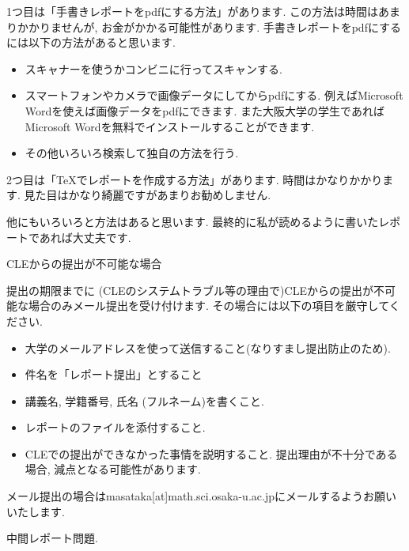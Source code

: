 \documentclass[dvipdfmx,a4paper,11pt]{article}
\theoremstyle{definition}
\begin{document}
1つ目は「手書きレポートをpdfにする方法」があります.
この方法は時間はあまりかかりませんが, お金がかかる可能性があります.
手書きレポートをpdfにするには以下の方法があると思います.
\begin{itemize}
\setlength{\parskip}{0cm} %
  \setlength{\itemsep}{0cm}
\item スキャナーを使うかコンビニに行ってスキャンする.
\item スマートフォンやカメラで画像データにしてからpdfにする. 例えばMicrosoft Wordを使えば画像データをpdfにできます. また大阪大学の学生であればMicrosoft Wordを無料でインストールすることができます.
\item その他いろいろ検索して独自の方法を行う.
\end{itemize}

2つ目は「TeXでレポートを作成する方法」があります.
時間はかなりかかります. 見た目はかなり綺麗ですがあまりお勧めしません.
\vspace{11pt}

他にもいろいろと方法はあると思います. 最終的に私が読めるように書いたレポートであれば大丈夫です.

\vspace{11pt}
 \hspace{-11pt}
{\Large CLEからの提出が不可能な場合}
\vspace{11pt}

提出の期限までに (CLEのシステムトラブル等の理由で)CLEからの提出が不可能な場合のみメール提出を受け付けます.
その場合には以下の項目を厳守してください.
\begin{itemize}
\setlength{\parskip}{0cm} %
  \setlength{\itemsep}{0cm}
\item 大学のメールアドレスを使って送信すること(なりすまし提出防止のため).
\item 件名を「レポート提出」とすること
\item 講義名, 学籍番号, 氏名 (フルネーム)を書くこと.
\item レポートのファイルを添付すること.
\item CLEでの提出ができなかった事情を説明すること. 提出理由が不十分である場合, 減点となる可能性があります.
\end{itemize}

メール提出の場合はmasataka[at]math.sci.osaka-u.ac.jpにメールするようお願いいたします.

\newpage
\begin{center}
{\LARGE 中間レポート問題.} 
\end{center}
\end{document}
